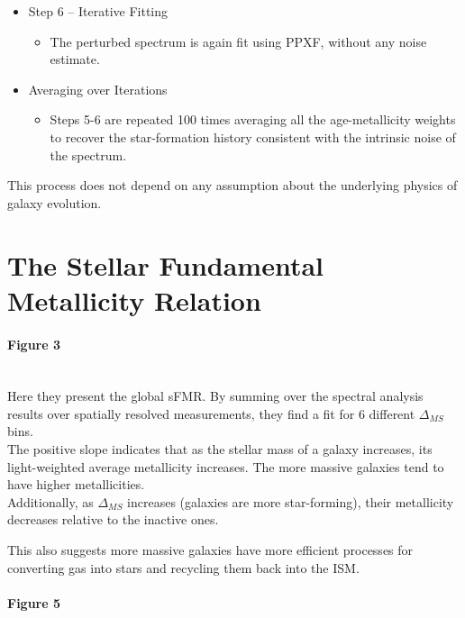 \documentclass[svgnames]{article}     %
\begin{document}
\begin{itemize}
  \item Step 6 -- Iterative Fitting
    \begin{itemize}
      \item The perturbed spectrum is again fit using PPXF, without any noise
        estimate. 
    \end{itemize}
  \item Averaging over Iterations
    \begin{itemize}
      \item Steps 5-6 are repeated 100 times averaging all the age-metallicity
        weights to recover the star-formation history consistent with the
        intrinsic noise of the spectrum. 
    \end{itemize}
\end{itemize}

This process does not depend on any assumption about the underlying physics of
galaxy evolution. 


\section{The Stellar Fundamental Metallicity Relation}

\paragraph{Figure 3} \mbox{} \\ 

Here they present the global sFMR. By summing over the spectral analysis
results over spatially resolved measurements, they find a fit for 6 different
$\Delta_{MS}$ bins. \\

The positive slope indicates that as the stellar mass of a galaxy increases,
its light-weighted average metallicity increases. The more massive galaxies
tend to have higher metallicities. \\

Additionally, as $\Delta_{MS}$ increases (galaxies are more star-forming),
their metallicity decreases relative to the inactive ones. 

This also suggests more massive galaxies have more efficient processes for
converting gas into stars and recycling them back into the ISM. \\

\paragraph{Figure 5} \mbox{} \\ 
\end{document}
